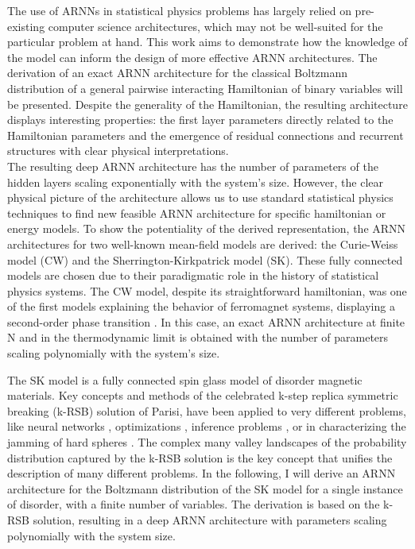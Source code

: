 \documentclass[aps,physrev,10pt,floatfix,reprint]{revtex4-2}
\begin{document}
The use of ARNNs in statistical physics problems has largely relied on pre-existing computer science architectures, which may not be well-suited for the particular problem at hand. This work aims to demonstrate how the knowledge of the model can inform the design of more effective ARNN architectures. The derivation of an exact ARNN architecture for the classical Boltzmann distribution of a general pairwise interacting Hamiltonian of binary variables will be presented. Despite the generality of the Hamiltonian, the resulting architecture displays interesting properties: the first layer parameters directly related to the Hamiltonian parameters and the emergence of residual connections and recurrent structures with clear physical interpretations.\\

The resulting deep ARNN architecture has the number of parameters of the hidden layers scaling exponentially with the system's size. 
However, the clear physical picture of the architecture allows us to use standard statistical physics techniques to find new feasible ARNN architecture for specific hamiltonian or energy models. To show the potentiality of the derived representation, the ARNN architectures for two well-known mean-field models are derived: the Curie-Weiss model (CW) and the Sherrington-Kirkpatrick model (SK). These fully connected models are chosen due to their paradigmatic role in the history of statistical physics systems. The CW model, despite its straightforward hamiltonian, was one of the first models explaining the behavior of ferromagnet systems, displaying a second-order phase transition \cite{kadanoff2000statistical}. In this case, an exact ARNN architecture at finite N and in the thermodynamic limit is obtained with the number of parameters scaling polynomially with the system's size.

The SK model \cite{PhysRevLett.35.1792} is a fully connected spin glass model of disorder magnetic materials. 
Key concepts and methods of the celebrated \cite{Nobel2021} k-step replica symmetric breaking (k-RSB) solution \cite{PARISI1979203, PhysRevLett.43.1754} of Parisi, have been applied to very different problems, like neural networks \cite{Gardner_1987, PhysRevLett.55.1530}, optimizations \cite{doi:10.1126/science.1073287}, inference problems \cite{doi:10.1080/00018732.2016.1211393}, or in characterizing the jamming of hard spheres \cite{RevModPhys.82.789, PhysRevLett.102.195701}. The complex many valley landscapes of the probability distribution captured by the k-RSB solution is the key concept that unifies the description of many different problems. In the following, I will derive an ARNN architecture for the Boltzmann distribution of the SK model for a single instance of disorder, with a finite number of variables. The derivation is based on the k-RSB solution, resulting in a deep ARNN architecture with parameters scaling polynomially with the system size. \\
            
\end{document}
